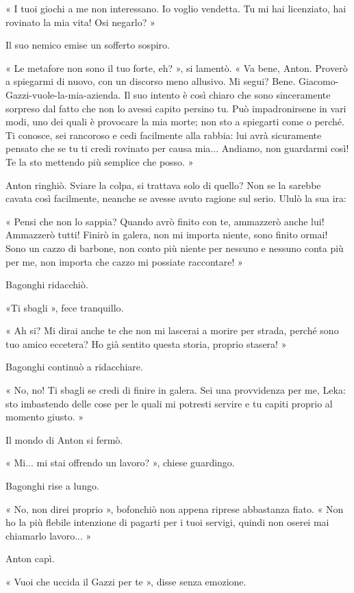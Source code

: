 « I tuoi giochi a me non interessano. Io voglio vendetta. Tu mi hai licenziato, hai rovinato la mia vita! Osi negarlo? »

Il suo nemico emise un sofferto sospiro.

« Le metafore non sono il tuo forte, eh? », si lamentò. « Va bene, Anton. Proverò a spiegarmi di nuovo, con un discorso meno allusivo. Mi segui? Bene. Giacomo-Gazzi-vuole-la-mia-azienda. Il suo intento è così chiaro che sono sinceramente sorpreso dal fatto che non lo avessi capito persino tu. Può impadronirsene in vari modi, uno dei quali è provocare la mia morte; non sto a spiegarti come o perché. Ti conosce, sei rancoroso e cedi facilmente alla rabbia: lui avrà sicuramente pensato che se tu ti credi rovinato per causa mia... Andiamo, non guardarmi così! Te la sto mettendo più semplice che posso. »

Anton ringhiò. Sviare la colpa, si trattava solo di quello? Non se la sarebbe cavata così facilmente, neanche se avesse avuto ragione sul serio. Ululò la sua ira:

« Pensi che non lo sappia? Quando avrò finito con te, ammazzerò anche lui! Ammazzerò tutti! Finirò in galera, non mi importa niente, sono finito ormai! Sono un cazzo di barbone, non conto più niente per nessuno e nessuno conta più per me, non importa che cazzo mi possiate raccontare! »

Bagonghi ridacchiò.

«Ti sbagli », fece tranquillo.

« Ah si? Mi dirai anche te che non mi lascerai a morire per strada, perché sono tuo amico eccetera? Ho già sentito questa storia, proprio stasera! »

Bagonghi continuò a ridacchiare.

« No, no! Ti sbagli se credi di finire in galera. Sei una provvidenza per me, Leka: sto imbastendo delle cose per le quali mi potresti servire e tu capiti proprio al momento giusto. »

Il mondo di Anton si fermò.

« Mi... mi stai offrendo un lavoro? », chiese guardingo.

Bagonghi rise a lungo.

« No, non direi proprio », bofonchiò non appena riprese abbastanza fiato. « Non ho la più flebile intenzione di pagarti per i tuoi servigi, quindi non oserei mai chiamarlo lavoro... »

Anton capì.

« Vuoi che uccida il Gazzi per te », disse senza emozione.

